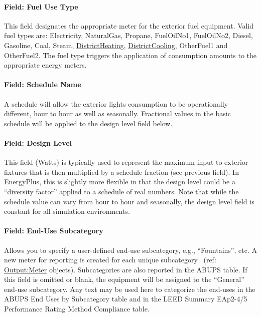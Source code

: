 \paragraph{Field: Fuel Use Type}\label{exteriorfuelequipment-field-fuel-use-type}

This field designates the appropriate meter for the exterior fuel equipment. Valid fuel types are: Electricity, NaturalGas, Propane, FuelOilNo1, FuelOilNo2, Diesel, Gasoline, Coal, Steam, \hyperref[districtheating]{DistrictHeating}, \hyperref[districtcooling]{DistrictCooling}, OtherFuel1 and OtherFuel2. The fuel type triggers the application of consumption amounts to the appropriate energy meters.

\paragraph{Field: Schedule Name}\label{field-schedule-name-1-000}

A schedule will allow the exterior lights consumption to be operationally different, hour to hour as well as seasonally. Fractional values in the basic schedule will be applied to the design level field below.

\paragraph{Field: Design Level}\label{field-design-level-1}

This field (Watts) is typically used to represent the maximum input to exterior fixtures that is then multiplied by a schedule fraction (see previous field). In EnergyPlus, this is slightly more flexible in that the design level could be a ``diversity factor'' applied to a schedule of real numbers. Note that while the schedule value can vary from hour to hour and seasonally, the design level field is constant for all simulation environments.

\paragraph{Field: End-Use Subcategory}\label{field-end-use-subcategory-1}

Allows you to specify a user-defined end-use subcategory, e.g., ``Fountains'', etc. A new meter for reporting is created for each unique subcategory~ (ref: \hyperref[outputmeter-and-outputmetermeterfileonly]{Output:Meter} objects). Subcategories are also reported in the ABUPS table. If this field is omitted or blank, the equipment will be assigned to the ``General'' end-use subcategory. Any text may be used here to categorize the end-uses in the ABUPS End Uses by Subcategory table and in the LEED Summary EAp2-4/5 Performance Rating Method Compliance table.

